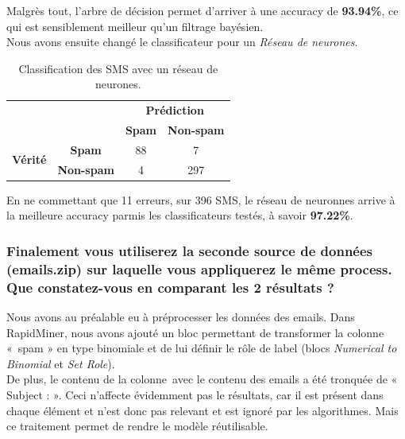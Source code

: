 \documentclass[a4paper]{article}
\begin{document}
Malgrès tout, l'arbre de décision permet d'arriver à une accuracy de \textbf{93.94\%}, ce qui est sensiblement meilleur qu'un filtrage bayésien.
\\

Nous avons ensuite changé le classificateur pour un \textit{Réseau de neurones}.

\begin{table}[H]
	\centering
	\def\arraystretch{2.0}
	\begin{tabular}{cccl}
															  & \textbf{}                              & \multicolumn{2}{c}{\textbf{Prédiction}}                                          \\ \cline{3-4} 
															  & \multicolumn{1}{c|}{}                  & \multicolumn{1}{c|}{\textbf{Spam}}      & \multicolumn{1}{c|}{\textbf{Non-spam}} \\ \cline{2-4} 
		\multicolumn{1}{c|}{\multirow{2}{*}{\textbf{Vérité}}} & \multicolumn{1}{c|}{\textbf{Spam}}     & \multicolumn{1}{c|}{88}                 & \multicolumn{1}{c|}{7}                 \\ \cline{2-4} 
		\multicolumn{1}{c|}{}                                 & \multicolumn{1}{c|}{\textbf{Non-spam}} & \multicolumn{1}{c|}{4}                  & \multicolumn{1}{c|}{297}               \\ \cline{2-4} 
	\end{tabular}
	\caption{Classification des SMS avec un réseau de neurones.}
\end{table}

En ne commettant que 11 erreurs, sur 396 SMS, le réseau de neuronnes arrive à la meilleure accuracy parmis les classificateurs testés,
à savoir \textbf{97.22\%}.

\subsubsection*{Finalement vous utiliserez la seconde source de données (emails.zip) sur laquelle vous appliquerez le même process. Que constatez-vous en comparant les 2 résultats ?}

Nous avons au préalable eu à préprocesser les données des emails.
Dans RapidMiner, nous avons ajouté un bloc permettant de transformer la colonne « spam » en type binomiale et de lui définir le rôle de label (blocs \textit{Numerical to Binomial} et \textit{Set Role}).
\\
De plus, le contenu de la colonne avec le contenu des emails a été tronquée de « Subject : ».
Ceci n'affecte évidemment pas le résultats, car il est présent dans chaque élément et n'est donc pas relevant et est ignoré par les algorithmes. Mais ce traitement permet de rendre le modèle réutilisable.
\\
\end{document}
